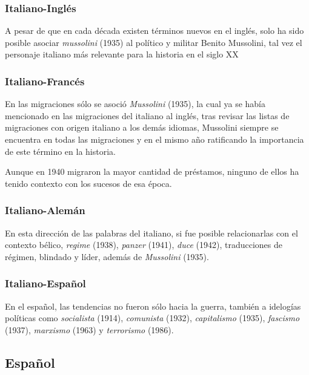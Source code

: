 \subsubsection*{Italiano-Inglés}%

A pesar de que en cada década existen términos nuevos en el inglés, solo ha sido posible asociar \textit{mussolini} (1935) al político y militar Benito Mussolini, tal vez el personaje italiano más relevante para la historia en el siglo XX 

\subsubsection*{Italiano-Francés}%



En las migraciones sólo se asoció \textit{Mussolini} (1935), la cual ya se había mencionado en las migraciones del italiano al inglés, tras revisar las listas de migraciones con origen italiano  a los demás idiomas, Mussolini siempre se encuentra en todas las migraciones y en el mismo año ratificando la importancia de este término en la historia. 

Aunque en 1940 migraron la mayor cantidad de préstamos, ninguno de ellos ha tenido contexto con los sucesos de esa época. 

\subsubsection*{Italiano-Alemán}%

En esta dirección de las palabras del italiano, si fue posible relacionarlas con el contexto bélico,  \textit{regime} (1938), \textit{panzer} (1941), \textit{duce} (1942),  traducciones de régimen, blindado y líder, además de \textit{Mussolini} (1935). 



\subsubsection*{Italiano-Español}%

En el español, las tendencias no fueron sólo hacia la guerra, también a idelogías políticas como \textit{socialista} (1914), \textit{comunista} (1932), \textit{capitalismo} (1935), \textit{fascismo} (1937),  \textit{marxismo} (1963) y \textit{terrorismo} (1986). 



\subsection{Español}%

